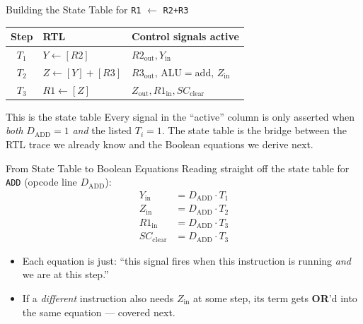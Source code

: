 \documentclass[aspectratio=169]{beamer}
\begin{document}
\begin{frame}{Building the State Table for \texttt{R1} $\gets$ \texttt{R2+R3}}
  \footnotesize
  \begin{tabular}{@{}cll@{}}
    \toprule
    \textbf{Step} & \textbf{RTL} & \textbf{Control signals active} \\
    \midrule
    $T_1$ & $Y \gets [R2]$            & $R2_{\text{out}}, Y_{\text{in}}$ \\
    $T_2$ & $Z \gets [Y] + [R3]$      & $R3_{\text{out}}$, ALU$=$add, $Z_{\text{in}}$ \\
    $T_3$ & $R1 \gets [Z]$            & $Z_{\text{out}}, R1_{\text{in}}, SC_{\text{clear}}$ \\
    \bottomrule
  \end{tabular}
  \vspace{0.3cm}
  \begin{exampleblock}{This is the state table}
    Every signal in the ``active'' column is only asserted when \emph{both}
    $D_{\text{ADD}} = 1$ \emph{and} the listed $T_i = 1$. The state table is the
    bridge between the RTL trace we already know and the Boolean equations we
    derive next.
  \end{exampleblock}
\end{frame}

\begin{frame}{From State Table to Boolean Equations}
  Reading straight off the state table for \texttt{ADD} (opcode line $D_{\text{ADD}}$):
  \begin{align*}
    Y_{\text{in}} &= D_{\text{ADD}} \cdot T_1 \\
    Z_{\text{in}} &= D_{\text{ADD}} \cdot T_2 \\
    R1_{\text{in}} &= D_{\text{ADD}} \cdot T_3 \\
    SC_{\text{clear}} &= D_{\text{ADD}} \cdot T_3
  \end{align*}
  \begin{itemize}
    \item Each equation is just: ``this signal fires when this instruction is
      running \emph{and} we are at this step.''
    \item If a \emph{different} instruction also needs $Z_{\text{in}}$ at some step, its
      term gets \textbf{OR}'d into the same equation --- covered next.
  \end{itemize}
\end{frame}
\end{document}
